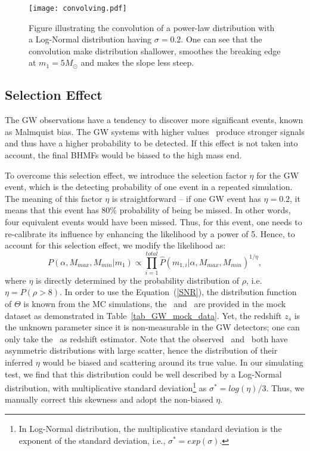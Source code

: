 \documentclass[twocolumn]{aastex62}
\begin{document}
\begin{figure}%
\texttt{[image: convolving.pdf]}
\caption{
Figure illustrating the convolution of a power-law distribution with a Log-Normal distribution having $\sigma = 0.2$. One can see that the convolution make distribution shallower, smoothes the breaking edge at $m_1 = 5 M_{\odot}$ and makes the slope less steep.
}
\label{fig:result_slope}
\end{figure}

\subsection{Selection Effect}\label{sec_likelihood_sf}
The GW observations have a tendency to discover more significant events, known as Malmquist bias. The GW systems with higher values \mone\ produce  stronger signals and thus have a higher probability to be detected. If this effect is not taken into account, the final BHMFs would be biased to the high mass end.

To overcome this selection effect, we introduce the selection factor $\eta$ for the GW event, which is the detecting probability of one event in a repeated simulation. The meaning of this factor $\eta$ is straightforward -- if one GW event has $\eta=0.2$, it means that this event has 80\% probability of being be missed. In other words, four equivalent events would have been missed. Thus, for this event, one needs to re-calibrate its influence by  enhancing the likelihood by a power of 5. Hence, to account for this  selection effect, we modify the likelihood as:
 \begin{equation} \label{equ_lik_sf}
 P(\alpha, M_{max}, M_{min}|m_{1}) \propto  \prod_{i=1}^{total} \hat{P}(m_{1,i}|\alpha, M_{max}, M_{min})^{1/\eta},
 \end{equation}
where $\eta$ is directly determined by the probability distribution of $\rho$, i.e. $\eta = P(\rho>8)$. In order to use the Equation~(\ref{SNR}), the distribution function of $\Theta$ is known from the MC simulations, the \cmass\ and \dl\ are provided in the mock dataset as demonstrated in Table~\ref{tab_GW_mock_data}. Yet, the redshift $z_s$ is the unknown parameter since it is non-measurable in the GW detectors; one can only take the \dl\ as redshift estimator.
Note that the observed \dl\ and \cmass\ both have asymmetric distributions with large scatter, hence the distribution of their inferred $\eta$ would be biased and scattering around its true value. In our simulating test, we find that this distribution could be well described by a Log-Normal distribution, with multiplicative standard deviation\footnote{In Log-Normal distribution, the multiplicative standard deviation is the exponent  of the standard deviation, i.e., $\sigma^* = exp(\sigma)$.} as $\sigma^*=log(\eta)/3$. Thus, we manually correct this skewness and adopt the non-biased $\eta$.
\end{document}
